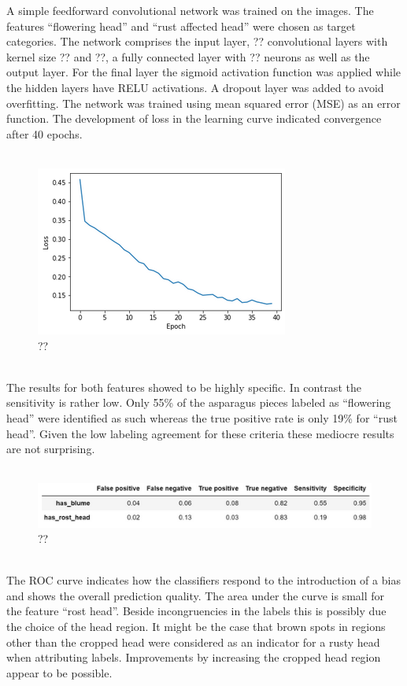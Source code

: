 A simple feedforward convolutional network was trained on the images. The features “flowering head” and “rust affected head” were chosen as target categories. The network comprises the input layer, ?? convolutional layers with kernel size ?? and ??, a fully connected layer with ?? neurons as well as the output layer. For the final layer the sigmoid activation function was applied while the hidden layers have RELU activations. A dropout layer was added to avoid overfitting. The network was trained using mean squared error (MSE) as an error function. The development of loss in the learning curve indicated convergence after 40 epochs. \\
\\
\begin{figure}[h]
	\centering
	\includegraphics[scale=0.6]{Figures/chapter04/fe_head_curve}
	\decoRule
	\caption[??]{??}
	\label{fig:FeatureEngineeringHeadCurve}
\end{figure}
\\
The results for both features showed to be highly specific. In contrast the sensitivity is rather low. Only 55\% of the asparagus pieces labeled as “flowering head” were identified as such whereas the true positive rate is only 19\% for “rust head”. Given the low labeling agreement for these criteria these mediocre results are not surprising. \\
\\
\begin{figure}[h]
	\centering
	\includegraphics[scale=0.6]{Figures/chapter04/fe_head_table}
	\decoRule
	\caption[??]{??}
	\label{fig:FeatureEngineeringHeadTable}
\end{figure}
\\
The ROC curve indicates how the classifiers respond to the introduction of a bias and shows the overall prediction quality. The area under the curve is small for the feature “rost head”. Beside incongruencies in the labels this is possibly due the choice of the head region. It might be the case that brown spots in regions other than the cropped head were considered as an indicator for a rusty head when attributing labels. Improvements by increasing the cropped head region appear to be possible. \\
